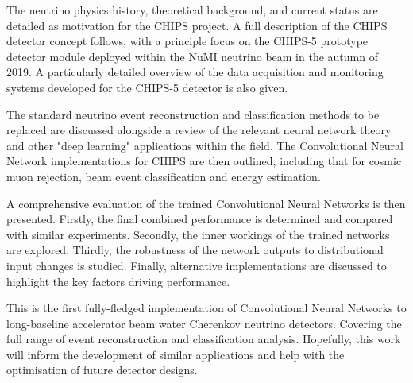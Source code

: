 The neutrino physics history, theoretical background, and current status are detailed as
motivation for the CHIPS project. A full description of the CHIPS detector concept follows, with a
principle focus on the CHIPS-5 prototype detector module deployed within the NuMI neutrino beam in
the autumn of 2019. A particularly detailed overview of the data acquisition and monitoring
systems developed for the CHIPS-5 detector is also given.

The standard neutrino event reconstruction and classification methods to be replaced are discussed
alongside a review of the relevant neural network theory and other "deep learning" applications
within the field. The Convolutional Neural Network implementations for CHIPS are then outlined,
including that for cosmic muon rejection, beam event classification and energy estimation.

A comprehensive evaluation of the trained Convolutional Neural Networks is then presented.
Firstly, the final combined performance is determined and compared with similar experiments.
Secondly, the inner workings of the trained networks are explored. Thirdly, the robustness of the
network outputs to distributional input changes is studied. Finally, alternative implementations
are discussed to highlight the key factors driving performance.

This is the first fully-fledged implementation of Convolutional Neural Networks to long-baseline
accelerator beam water Cherenkov neutrino detectors. Covering the full range of event
reconstruction and classification analysis. Hopefully, this work will inform the development of
similar applications and help with the optimisation of future \chips detector designs. 